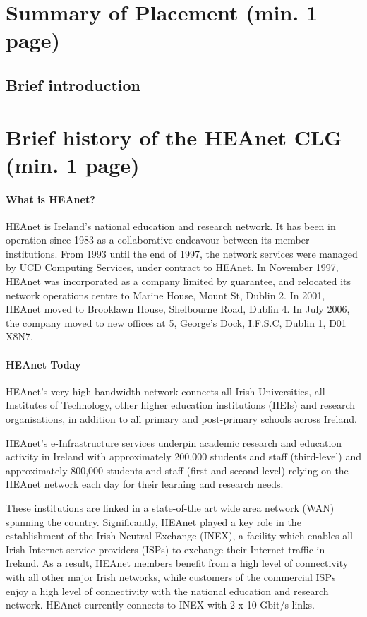 \documentclass{article}
\begin{document}
\section{Summary of Placement (min. 1 page)}
\subsection{Brief introduction}
	
\newpage
\section{Brief history of the HEAnet CLG (min. 1 page)}
	
\paragraph{What is HEAnet?}
HEAnet is Ireland's national education and research network. It has been in operation since 1983 as a collaborative endeavour between its member institutions. From 1993 until the end of 1997, the network services were managed by UCD Computing Services, under contract to HEAnet. In November 1997, HEAnet was incorporated as a company limited by guarantee, and relocated its network operations centre to Marine House, Mount St, Dublin 2. In 2001, HEAnet moved to Brooklawn House, Shelbourne Road, Dublin 4. In July 2006, the company moved to new offices at 5, George's Dock, I.F.S.C, Dublin 1, D01 X8N7.
	
\paragraph{HEAnet Today}
	
HEAnet's very high bandwidth network connects all Irish Universities, all Institutes of Technology, other higher education institutions (HEIs) and research organisations, in addition to all primary and post-primary schools across Ireland.
	
HEAnet's e-Infrastructure services underpin academic research and education activity in Ireland with approximately 200,000 students and staff (third-level) and approximately 800,000 students and staff (first and second-level) relying on the HEAnet network each day for their learning and research needs.
	
These institutions are linked in a state-of-the art wide area network (WAN) spanning the country. Significantly, HEAnet played a key role in the establishment of the Irish Neutral Exchange (INEX), a facility which enables all Irish Internet service providers (ISPs) to exchange their Internet traffic in Ireland. As a result, HEAnet members benefit from a high level of connectivity with all other major Irish networks, while customers of the commercial ISPs enjoy a high level of connectivity with the national education and research network. HEAnet currently connects to INEX with 2 x 10 Gbit/s links.
	
\end{document}
